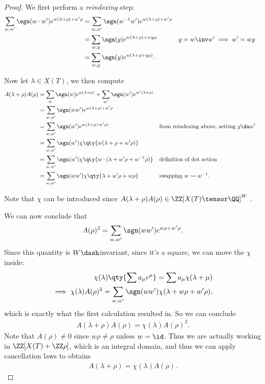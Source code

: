 \begin{proof}

We first perform a \emph{reindexing} step:
\begin{align*}  
\sum_{w, w'} \sgn(w\cdot w') e^{w(\lambda+\rho) + w'\rho}
&= \sum_{w, w'} \sgn(w^{-1} w') e^{w(\lambda+\rho) + w'\rho} \\
&= \sum_{w, y} \sgn(y) e^{w(\lambda+\rho) + wy\rho} && y = w\inv w' \implies w' = wy \\
&= \sum_{w, y} \sgn(y) e^{w(\lambda + \rho + y\rho)}
.\end{align*}

Now let \(\lambda\in X(T)\), we then compute
\begin{align*}  
A(\lambda + \rho) A(\rho)
&=
\sum_{w} \sgn(w) e^{w(\lambda + \rho)}
+ \sum_{w'} \sgn(w') e^{w'(\lambda + \rho)}  \\
&=
\sum_{w, w'} \sgn(ww') e^{w(\lambda + \rho) + w'\rho} \\
&= 
\sum_{w, w'} \sgn(w') e^{w(\lambda + \rho + w'\rho)} && \text{from reindexing above, setting } y\da w' \\
&= \sum_{w, w'} \sgn(w') \chi\qty{w(\lambda + \rho + w'\rho)} \\
&= \sum_{w, w'} \sgn(w') \chi\qty{w\cdot (\lambda + w'\rho + w^{-1} \rho)} && \text{definition of dot action}\\
&= \sum_{w, w'} \sgn(ww') \chi\qty{\lambda + w'\rho + w\rho }  && \text{swapping } w\leadsto w^{-1}  
.\end{align*}

Note that \(\chi\) can be introduced since
\(A(\lambda + \rho)A(\rho) \in \ZZ[X(T) \tensor \QQ]^{W\cdot}\).


We can now conclude that
\begin{align*}  
A(\rho)^2 = \sum_{w, w'} \sgn(ww') e^{w\rho + w' \rho}
.\end{align*} Since this quantity is \(W\dash\)invariant, since it's a
square, we can move the \(\chi\) inside:
\begin{align*}  
\chi(\lambda) \qty{ \sum a_\mu e^\mu } = \sum a_\mu \chi(\lambda + \mu) \\
\implies \chi(\lambda) A(\rho)^2 = \sum_{w, w'} \sgn(ww') \chi(\lambda + w\rho + w'\rho)
,\end{align*} which is exactly what the first calculation resulted in.
So we can conclude
\begin{align*}  
A(\lambda + \rho) A(\rho) = \chi(\lambda) A(\rho)^2
.\end{align*} Note that \(A(\rho) \neq 0\) since \(w\rho \neq \rho\)
unless \(w=\id\). Thus we are actually working in
\(\ZZ[X(T) + \ZZ\rho]\), which is an integral domain, and thus we can
apply cancellation laws to obtains
\begin{align*}  
A(\lambda + \rho) = \chi(\lambda) A(\rho)
.\end{align*}

\end{proof}

